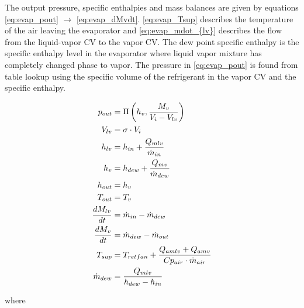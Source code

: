 \medskip
The output pressure, specific enthalpies and mass balances are given by equations \cref{eq:evap_pout} $\rightarrow$ \cref{eq:evap_dMvdt}. \cref{eq:evap_Tsup} describes the temperature of the air leaving the evaporator and \cref{eq:evap_mdot_{lv}} describes the flow from the liquid-vapor CV to the vapor CV. The dew point specific enthalpy is the specific enthalpy level in the evaporator where liquid vapor mixture has completely changed phase to vapor. The pressure in \cref{eq:evap_pout} is found from table lookup using the specific volume of the refrigerant in the vapor CV and the specific enthalpy.

\begin{align}
	p_{out}            & = \Pi \left( h_v, \frac{M_v}{V_i-V_{lv}} \right)		\label{eq:evap_pout}                       \\
	V_{lv}             & = \sigma \cdot V_i                                                                           \\
	h_{lv}             & = h_{in} + \frac{Q_{mlv}}{\dot{m}_{in}}                                                      \\
	h_v                & = h_{dew} + \frac{Q_{mv}}{\dot{m}_{dew}}                                                     \\
	h_{out}            & = h_v                                                                                        \\
	T_{out}            & = T_v                                                                                        \\
	\frac{dM_{lv}}{dt} & = \dot{m}_{in} - \dot{m}_{dew}                                                               \\
	\frac{dM_v}{dt}    & = \dot{m}_{dew} - \dot{m}_{out}                   \label{eq:evap_dMvdt}                      \\
	T_{sup}            & = T_{retfan} +  \frac{Q_{amlv} + Q_{amv}}{Cp_{air} \cdot \dot{m}_{air}} \label{eq:evap_Tsup} \\
	\dot{m}_{dew}      & = \frac{Q_{mlv}}{h_{dew} - h_{in}} \label{eq:evap_mdot_{lv}}
\end{align}



where\\


